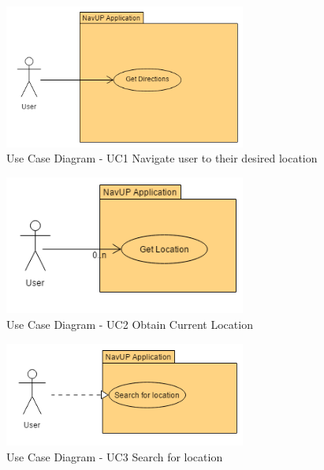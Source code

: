\newpage
		\graphicspath{ {./Images/User/} }
		\begin{figure}[h]
		\caption{Use Case Diagram -  UC1 Navigate user to their desired location}
		\includegraphics[width = 300px]{GetDesiredLocation.png}
		
		\end{figure}

		\graphicspath{ {./Images/User/} }
		\begin{figure}[h]
		\caption{Use Case Diagram -  UC2  Obtain Current Location}
		\includegraphics[width = 300px]{ObtainCurrentLocation.png}
		\end{figure}

		 \graphicspath{ {./Images/User/} }
		\begin{figure}[h]
		\caption{Use Case Diagram -  UC3  Search for location}
		\includegraphics[width = 300px]{SearchForLocation.png}
		\end{figure}

